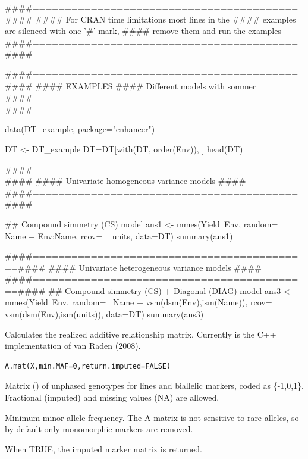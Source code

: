 \documentclass[a4paper]{book}
\begin{document}
%
\begin{Examples}
\begin{ExampleCode}

####=========================================####
#### For CRAN time limitations most lines in the 
#### examples are silenced with one '#' mark, 
#### remove them and run the examples
####=========================================####

####=========================================####
#### EXAMPLES
#### Different models with sommer
####=========================================####

data(DT_example, package="enhancer")





DT <- DT_example
DT=DT[with(DT, order(Env)), ]
head(DT)

####=========================================####
#### Univariate homogeneous variance models  ####
####=========================================####

## Compound simmetry (CS) model
ans1 <- mmes(Yield~Env,
             random= ~ Name + Env:Name,
             rcov= ~ units,
             data=DT)
summary(ans1)

####===========================================####
#### Univariate heterogeneous variance models  ####
####===========================================####
## Compound simmetry (CS) + Diagonal (DIAG) model
ans3 <- mmes(Yield~Env,
             random= ~Name + vsm(dsm(Env),ism(Name)),
             rcov= ~ vsm(dsm(Env),ism(units)),
             data=DT)
summary(ans3)





\end{ExampleCode}
\end{Examples}
%
\begin{Description}\relax
Calculates the realized additive relationship matrix. Currently is the C++ implementation of van Raden (2008). 
\end{Description}
%
\begin{Usage}
\begin{verbatim}
A.mat(X,min.MAF=0,return.imputed=FALSE)
\end{verbatim}
\end{Usage}
%
\begin{Arguments}
\begin{ldescription}
\item[\code{X}] 
Matrix () of unphased genotypes for  lines and  biallelic markers, 
coded as \{-1,0,1\}. Fractional (imputed) and missing values (NA) are allowed.

\item[\code{min.MAF}] 
Minimum minor allele frequency. The A matrix is not sensitive to rare alleles, so by default only monomorphic markers are removed.

\item[\code{return.imputed}] 
When TRUE, the imputed marker matrix is returned.  

\end{ldescription}
\end{Arguments}
\end{document}
